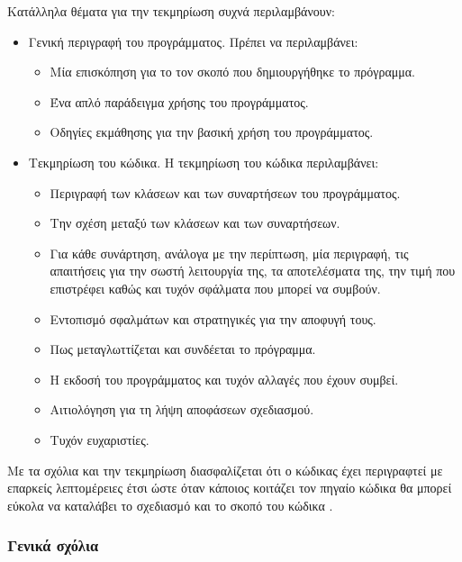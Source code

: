 Κατάλληλα θέματα για την τεκμηρίωση συχνά περιλαμβάνουν:
\begin{itemize}
\item Γενική περιγραφή του προγράμματος. Πρέπει να περιλαμβάνει: 
  \begin{itemize}
  \item Μία επισκόπηση για το τον σκοπό που δημιουργήθηκε το πρόγραμμα.
  \item Ένα απλό παράδειγμα χρήσης του προγράμματος.
  \item Οδηγίες εκμάθησης για την βασική χρήση του προγράμματος.
  \end{itemize}
\item Τεκμηρίωση του κώδικα. Η τεκμηρίωση του κώδικα περιλαμβάνει:
  \begin{itemize}
    \item Περιγραφή των κλάσεων και των συναρτήσεων του προγράμματος.
    \item Την σχέση μεταξύ των κλάσεων και των συναρτήσεων.
    \item Για κάθε συνάρτηση, ανάλογα με την περίπτωση, μία περιγραφή, τις απαιτήσεις για την σωστή λειτουργία της, τα αποτελέσματα της, την τιμή που επιστρέφει καθώς και τυχόν σφάλματα που μπορεί να συμβούν.
    \item Εντοπισμό σφαλμάτων και στρατηγικές για την αποφυγή τους.
    \item Πως μεταγλωττίζεται και συνδέεται το πρόγραμμα.
    \item Η εκδοσή του προγράμματος και τυχόν αλλαγές που έχουν συμβεί.
    \item Αιτιολόγηση για τη λήψη αποφάσεων σχεδιασμού.
    \item Τυχόν ευχαριστίες.
  \end{itemize}
\end{itemize}

Με τα σχόλια και την τεκμηρίωση διασφαλίζεται ότι ο κώδικας έχει περιγραφτεί με επαρκείς λεπτομέρειες έτσι ώστε όταν κάποιος κοιτάζει τον πηγαίο κώδικα θα μπορεί εύκολα να καταλάβει το σχεδιασμό και το σκοπό του κώδικα \cite{wikibook:cpp_style}.

\subsubsection[Γενικά σχόλια]{Γενικά σχόλια \cite{site:linux_style,sutter2004c++,wiki:coding_practices,site:google_style}}

